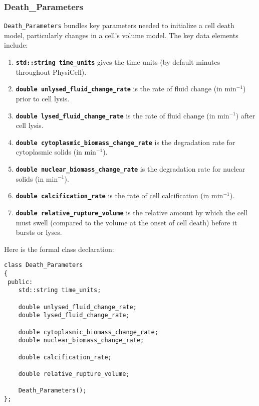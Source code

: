 \documentclass[12pt]{article}
\renewcommand{\v}{\verb}
\newcommand{\smallcode}[1]{\textbf{\texttt{#1}}}
\newcommand{\blue}[1]{\textcolor{blue}{#1}}
\newcommand{\DONE}{}%
\begin{document}
\subsubsection{Death\_Parameters \DONE}
\label{sec:Death_Parameters}
\v|Death_Parameters| bundles key parameters needed to initialize a cell death model, 
particularly changes in a cell's volume model. The key data elements include: 
\begin{enumerate}
\item 
\smallcode{std::string time\_units} gives the time units (by default minutes throughout PhysiCell). 

\item 
\smallcode{double unlysed\_fluid\_change\_rate} is the rate of fluid change (in $\textrm{min}^{-1}$) 
prior to cell lysis. 

\item 
\smallcode{double lysed\_fluid\_change\_rate} is the rate of fluid change (in $\textrm{min}^{-1}$) 
after cell lysis. 

\item 
\smallcode{double cytoplasmic\_biomass\_change\_rate} is the degradation rate for cytoplasmic 
solids (in $\textrm{min}^{-1}$). 

\item 
\smallcode{double nuclear\_biomass\_change\_rate} is the degradation rate for nuclear 
solids (in $\textrm{min}^{-1}$). 

\item 
\smallcode{double calcification\_rate} is the rate of cell calcification (in $\textrm{min}^{-1}$). 

\item 
\smallcode{double relative\_rupture\_volume} is the relative amount by which the cell must swell (compared 
to the volume at the onset of cell death) before it bursts or lyses. 
\end{enumerate}

Here is the formal class declaration: 

\begin{verbatim}
class Death_Parameters
{
 public:
    std::string time_units; 
 
    double unlysed_fluid_change_rate;
    double lysed_fluid_change_rate; 
    
    double cytoplasmic_biomass_change_rate;
    double nuclear_biomass_change_rate; 
    
    double calcification_rate; 
    
    double relative_rupture_volume; 
    
    Death_Parameters();      
};
\end{verbatim}
\end{document}
